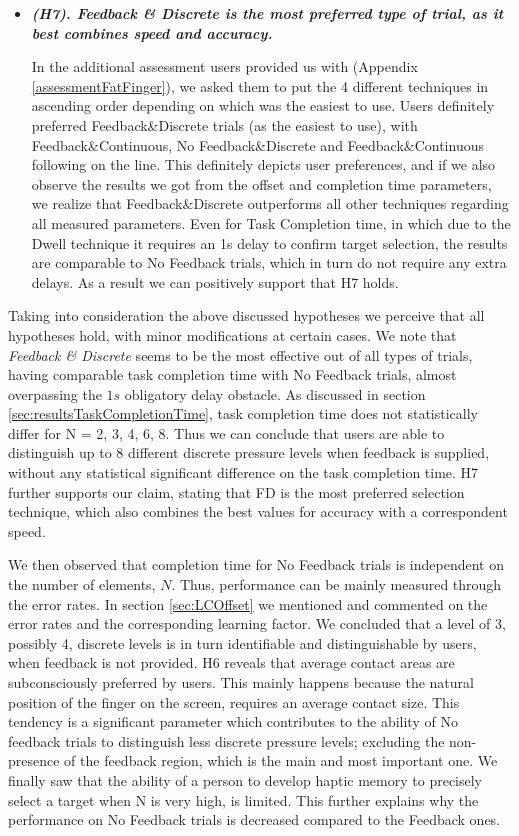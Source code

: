 \begin{itemize}
    \item \textbf{\textit{(H7). Feedback \& Discrete is the most preferred type of trial, as it best combines speed and accuracy.}}

    In the additional assessment users provided us with (Appendix \ref{assessmentFatFinger}), we asked them to put the 4 different techniques in ascending order depending on which was the easiest to use. Users definitely preferred Feedback\&Discrete trials (as the easiest to use), with Feedback\&Continuous, No Feedback\&Discrete and Feedback\&Continuous following on the line. This definitely depicts user preferences, and if we also observe the results we got from the offset and completion time parameters, we realize that Feedback\&Discrete outperforms all other techniques regarding all measured parameters. Even for Task Completion time, in which due to the Dwell technique it requires an 1s delay to confirm target selection, the results are comparable to No Feedback trials, which in turn do not require any extra delays. As a result we can positively support that H7 holds.

\end{itemize}




Taking into consideration the above discussed hypotheses we perceive that all hypotheses hold, with minor modifications at certain cases. We note that \emph{Feedback \& Discrete} seems to be the most effective out of all types of trials, having comparable task completion time with No Feedback trials, almost overpassing the $1s$ obligatory delay obstacle. As discussed in section \ref{sec:resultsTaskCompletionTime}, task completion time does not statistically differ for N = 2, 3, 4, 6, 8. Thus we can conclude that users are able to distinguish up to 8 different discrete pressure levels when feedback is supplied, without any statistical significant difference on the task completion time. H7 further supports our claim, stating that FD is the most preferred selection technique, which also combines the best values for accuracy with a correspondent speed. 

We then observed that completion time for No Feedback trials is independent on the number of elements, $N$. Thus, performance can be mainly measured through the error rates. In section \ref{sec:LCOffset} we mentioned and commented on the error rates and the corresponding learning factor. 
We concluded that a level of 3, possibly 4, discrete levels is in turn identifiable and distinguishable by users, when feedback is not provided. 
H6 reveals that average contact areas are subconsciously preferred by users. This mainly happens because the natural position of the finger on the screen, requires an average contact size. This tendency is a significant parameter which contributes to the ability of No feedback trials to distinguish less discrete pressure levels; excluding the non-presence of the feedback region, which is the main and most important one.
We finally saw that the ability of a person to develop haptic memory to precisely select a target when N is very high, is limited. This further explains why the performance on No Feedback trials is decreased compared to the Feedback ones. 


